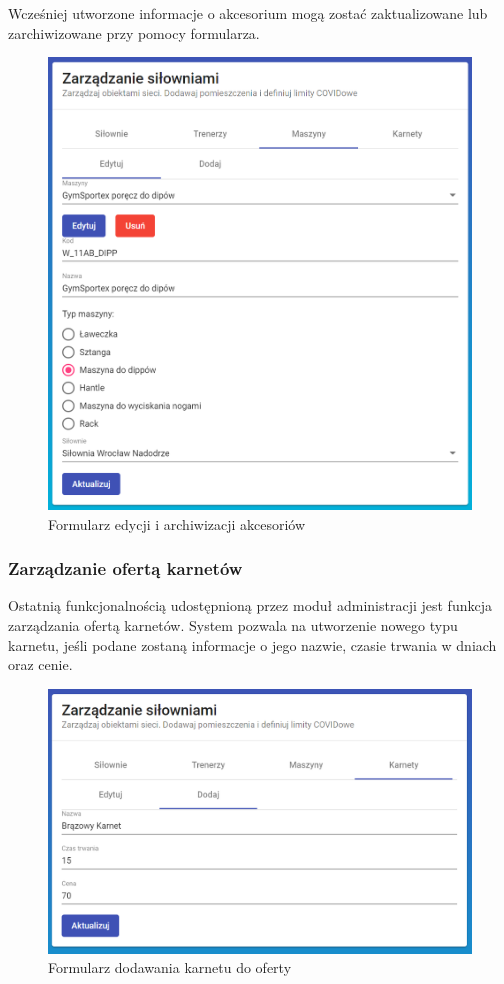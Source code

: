 \documentclass[a4paper,twoside,12pt]{book}
\begin{document}
Wcześniej utworzone informacje o akcesorium mogą zostać zaktualizowane lub zarchiwizowane przy pomocy formularza.
\begin{figure}[h!]
	\centering
	\includegraphics[width=1\linewidth]{../zrzuty_ekranu/dzialanie/akcesoria/aktualizacja_akcesorium}
	\caption{Formularz edycji i archiwizacji akcesoriów}
	\label{fig:aktualizacjaakcesorium}
\end{figure}
\FloatBarrier

\subsubsection{Zarządzanie ofertą karnetów}
Ostatnią funkcjonalnością udostępnioną przez moduł administracji jest funkcja zarządzania ofertą karnetów. System pozwala na utworzenie nowego typu karnetu, jeśli podane zostaną informacje o jego nazwie, czasie trwania w dniach oraz cenie.
\begin{figure}[h!]
	\centering
	\includegraphics[width=0.8\linewidth]{../zrzuty_ekranu/dzialanie/karnety/tworzenie_karnetu}
	\caption{Formularz dodawania karnetu do oferty}
	\label{fig:tworzeniekarnetu}
\end{figure}
\FloatBarrier
\end{document}
